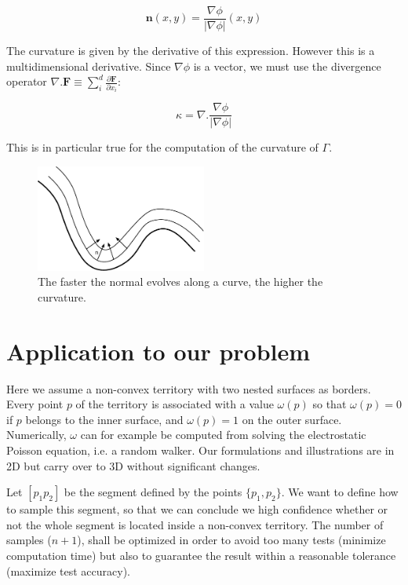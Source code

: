 \documentclass[11pt,a4paper]{article}
\begin{document}
	\begin{equation}
	\mathbf{n}(x,y) = \frac{\nabla \phi}{|\nabla \phi|}(x,y)
	\end{equation}
	
	The curvature is given by the derivative of this expression. However this is a multidimensional derivative. Since $\nabla \phi$ is a vector, we must use the divergence operator $\nabla . \mathbf{F} \equiv \sum_i^d \frac{\partial \mathbf{F}}{\partial x_i}$:
	
	\begin{equation}
	\kappa = \nabla . \frac{\nabla \phi}{|\nabla \phi|}
	\end{equation}
	
	This is in particular true for the computation of the curvature of $\Gamma$. 
	
		\begin{figure}
			\centering
			\includegraphics[width=0.5\textwidth]{Drawings/Distance.pdf}
			\caption{The faster the normal evolves along a curve, the higher the curvature.}
		\end{figure}
		
	\section{Application to our problem}
	
Here we assume a non-convex territory with two nested surfaces as borders. Every point $p$ of the territory is associated with a value $\omega(p)$ so that $\omega(p) = 0$ if $p$ belongs to the inner surface, and $\omega(p) = 1$ on the outer surface. Numerically, $\omega$ can for example be computed from solving the electrostatic Poisson equation, i.e. a random walker. Our formulations and illustrations are in 2D but carry over to 3D without significant changes.


Let $[p_1p_2]$ be the segment defined by the points $\{p_1, p_2\}$. We want to define how to sample this segment, so that we can conclude we high confidence whether or not the whole segment is located inside a non-convex territory. The number of samples ($n + 1$), shall be optimized in order to avoid too many tests (minimize computation time) but also to guarantee the result within a reasonable tolerance (maximize test accuracy).
\end{document}
